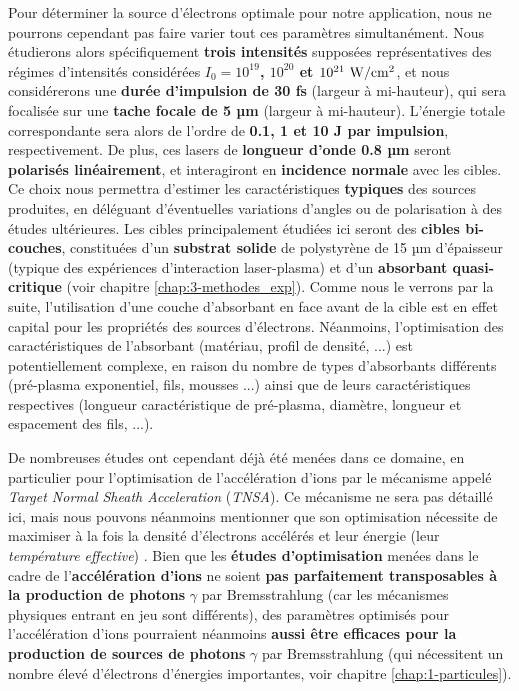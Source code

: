 \begin{refsection}
Pour déterminer la source d'électrons optimale pour notre application, nous ne pourrons cependant pas faire varier tout ces paramètres simultanément. Nous étudierons alors spécifiquement \textbf{trois intensités} supposées représentatives des régimes d'intensités considérées \textbf{$I_0=10^{19}$, $10^{20}$ et $10^{21} ~ \rm W/cm^2$}, et nous considérerons une \textbf{durée d'impulsion de 30 fs} (largeur à mi-hauteur), qui sera focalisée sur une \textbf{tache focale de 5 µm} (largeur à mi-hauteur). L'énergie totale correspondante sera alors de l'ordre de \textbf{0.1, 1 et 10 J par impulsion}, respectivement. De plus, ces lasers de \textbf{longueur d'onde 0.8 µm} seront \textbf{polarisés linéairement}, et interagiront en \textbf{incidence normale} avec les cibles. Ce choix nous permettra d'estimer les caractéristiques \textbf{typiques} des sources produites, en déléguant d'éventuelles variations d'angles ou de polarisation à des études ultérieures. Les cibles principalement étudiées ici seront des \textbf{cibles bi-couches}, constituées d'un \textbf{substrat solide} de polystyrène de 15 µm d'épaisseur (typique des expériences d'interaction laser-plasma) et d'un \textbf{absorbant quasi-critique} (voir chapitre \ref{chap:3-methodes_exp}). Comme nous le verrons par la suite, l'utilisation d'une couche d'absorbant en face avant de la cible est en effet capital pour les propriétés des sources d'électrons. Néanmoins, l'optimisation des caractéristiques de l'absorbant (matériau, profil de densité, ...) est potentiellement complexe, en raison du nombre de types d'absorbants différents (pré-plasma exponentiel, fils, mousses ...) ainsi que de leurs caractéristiques respectives (longueur caractéristique de pré-plasma, diamètre, longueur et espacement des fils, ...).

De nombreuses études ont cependant déjà été menées dans ce domaine, en particulier pour l'optimisation de l'accélération d'ions par le mécanisme appelé \textit{Target Normal Sheath Acceleration} (\textit{TNSA}). Ce mécanisme ne sera pas détaillé ici, mais nous pouvons néanmoins mentionner que son optimisation nécessite de maximiser à la fois la densité d'électrons accélérés et leur énergie (leur \textit{température effective}) \parencite{mora_2003}. Bien que les \textbf{études d'optimisation} menées dans le cadre de l'\textbf{accélération d'ions} ne soient \textbf{pas parfaitement transposables à la production de photons} $\gamma$ par Bremsstrahlung (car les mécanismes physiques entrant en jeu sont différents), des paramètres optimisés pour l'accélération d'ions pourraient néanmoins \textbf{aussi être efficaces pour la production de sources de photons} $\gamma$ par Bremsstrahlung (qui nécessitent un nombre élevé d'électrons d'énergies importantes, voir chapitre \ref{chap:1-particules}).


\end{refsection}

